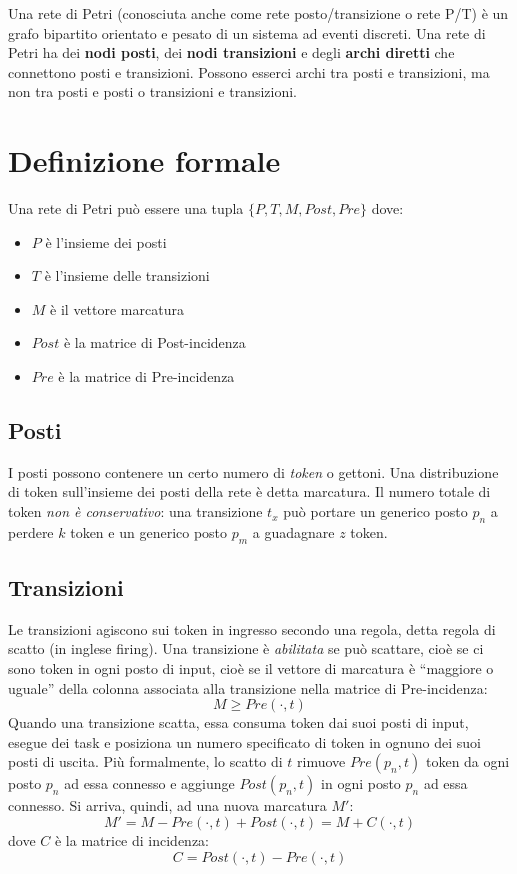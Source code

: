 \documentclass[a4paper]{report}
\newcommand{\bo}{\bfseries }
\begin{document}
Una rete di Petri (conosciuta anche come rete posto/transizione o rete
P/T) \`e un grafo bipartito orientato e pesato di un sistema ad eventi
discreti. Una rete di Petri ha dei {\bo nodi posti}, dei 
{\bo nodi transizioni} e degli {\bo archi diretti} che connettono
posti e transizioni. Possono esserci archi tra posti e transizioni, ma
non tra posti e posti o transizioni e transizioni. 

\section{Definizione formale}
Una rete di Petri pu\`o essere una tupla $\{ P, T, M, Post, Pre \}$ dove:
\begin{itemize}
\item $P$ \`e l'insieme dei posti
\item $T$ \`e l'insieme delle transizioni
\item $M$ \`e il vettore marcatura
\item $Post$ \`e la matrice di Post-incidenza 
\item $Pre$ \`e la matrice di Pre-incidenza 
\end{itemize}

\subsection{Posti}
I posti possono contenere un certo numero di {\em
  token} o gettoni. Una distribuzione di
token sull'insieme dei posti della rete \`e detta marcatura.
Il numero totale di token
{\em non \`e conservativo}: una transizione $t_x$ pu\`o portare un generico
posto $p_n$ a perdere $k$ token e un generico posto $p_m$ a guadagnare
$z$ token.
\subsection{Transizioni}
Le transizioni agiscono sui token in ingresso secondo una regola, detta
regola di scatto (in inglese firing). Una transizione \`e {\em
  abilitata} se pu\`o scattare, cio\`e se ci sono token in ogni posto
di input, cio\`e se il vettore di marcatura \`e ``maggiore o uguale''
della colonna associata alla transizione nella matrice di
Pre-incidenza:
\begin{equation}\label{eq:transizioneAbilitata}
M \geq Pre(\cdot,t)
\end{equation}
Quando una transizione scatta, essa consuma token dai suoi
posti di input, esegue dei task e posiziona un numero specificato di
token in ognuno dei suoi posti di uscita. Pi\`u formalmente, lo scatto
di $t$ rimuove $Pre(p_n,t)$ token da ogni posto $p_n$ ad essa connesso
e aggiunge $Post(p_n,t)$ in ogni posto $p_n$ ad essa connesso. Si
arriva, quindi, ad una nuova marcatura $M'$:
\begin{equation}\label{eq:marcaturaPostScatto}
  M' = M - Pre(\cdot,t) + Post(\cdot,t) = M + C(\cdot,t)
\end{equation}
dove $C$ \`e la matrice di incidenza:
\[
C = Post(\cdot, t) - Pre(\cdot, t)
\]
\end{document}
